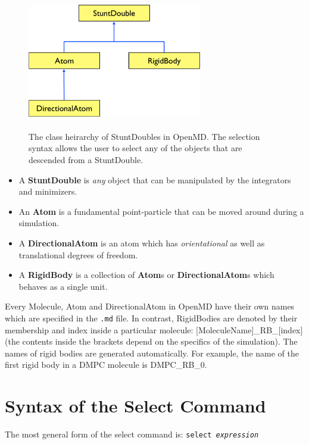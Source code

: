 \documentclass[]{book}
\begin{document}
\begin{figure}
\centering
\includegraphics[width=3in]{heirarchy.pdf}
\caption[Class heirarchy for StuntDoubles in {\sc OpenMD}]{ \\ The
class heirarchy of StuntDoubles in {\sc OpenMD}. The selection
syntax allows the user to select any of the objects that are descended
from a StuntDouble.}
\label{fig:heirarchy}
\end{figure}

\begin{itemize}
\item A {\bf StuntDouble} is {\it any} object that can be manipulated by the
integrators and minimizers. 
\item An {\bf Atom} is a fundamental point-particle that can be moved around during a simulation.
\item A {\bf DirectionalAtom} is an atom which has {\it orientational} as well as translational degrees of freedom.
\item A {\bf RigidBody} is a collection of {\bf Atom}s or {\bf
DirectionalAtom}s which behaves as a single unit.
\end{itemize} 

Every Molecule, Atom and DirectionalAtom in {\sc OpenMD} have their own names
which are specified in the {\tt .md} file. In contrast, RigidBodies are
denoted by their membership and index inside a particular molecule:
[MoleculeName]\_RB\_[index] (the contents inside the brackets
depend on the specifics of the simulation). The names of rigid bodies are
generated automatically. For example, the name of the first rigid body
in a DMPC molecule is DMPC\_RB\_0.

\section{\label{section:syntax}Syntax of the Select Command}

The most general form of the select command is: {\tt select {\it expression}}
\end{document}
